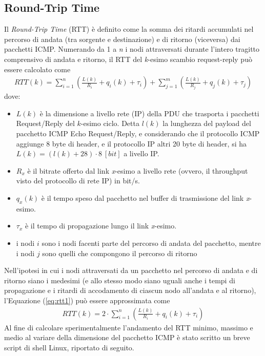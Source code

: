 \documentclass[a4paper,10pt]{article}
\begin{document}
\subsection{Round-Trip Time}
\label{par:x}
Il \textit{Round-Trip Time} (RTT) è definito come la somma dei ritardi accumulati nel percorso di andata (tra sorgente e destinazione) e di ritorno (viceversa) dai pacchetti ICMP. Numerando da 1 a \textit{n} i nodi attraversati durante l'intero tragitto comprensivo di andata e ritorno, il RTT del \textit{k}-esimo scambio request-reply può essere calcolato come
\begin{align}
RTT(k) = \sum_{i=1}^{n}  \left( \frac{L(k)}{R_i} + q_i(k) + \tau_i \right) + \sum_{j=1}^{m}  \left( \frac{L(k)}{R_j} + q_j(k) + \tau_j \right)
\label{eq:rtt1}
\end{align}
\vspace{-0.2cm}
dove:
\begin{itemize}
\item $L(k)$ è la dimensione a livello rete (IP) della PDU che trasporta i pacchetti Request/Reply del $k$-esimo ciclo.  Detta $l(k)$ la lunghezza del payload del pacchetto ICMP Echo Request/Reply, e considerando che il protocollo ICMP aggiunge 8 byte di header, e il protocollo IP altri 20 byte di header, si ha $L(k) = (l(k) + 28) \cdot 8 \ [bit]$ a livello IP.
\item $R_x$ è il bitrate offerto dal link \textit{x}-esimo a livello rete (ovvero, il throughput visto del protocollo di rete IP) in bit/s.
\item $q_x(k)$ è il tempo speso dal pacchetto nel buffer di trasmissione del link \textit{x}-esimo.
\item $\tau_x$ è il tempo di propagazione lungo il link \textit{x}-esimo.
\item i nodi $i$ sono i nodi facenti parte del percorso di andata del pacchetto, mentre i nodi $j$ sono quelli che compongono il percorso di ritorno
\end{itemize}
Nell'ipotesi in cui i nodi attraversati da un pacchetto nel percorso di andata e di ritorno siano i medesimi (e allo stesso modo siano uguali anche i tempi di propagazione e i ritardi di accodamento di ciascun nodo all'andata e al ritorno), l'Equazione (\ref{eq:rtt1}) può essere approssimata come
\begin{align}
RTT(k) = 2 \cdot  \sum_{i=1}^{n}  \left( \frac{L(k)}{R_i} + q_i(k) + \tau_i \right)
\label{eq:rtt}
\end{align}
Al fine di calcolare sperimentalmente l'andamento del RTT minimo, massimo e medio al variare della dimensione del pacchetto ICMP è stato scritto un breve script di shell Linux, riportato di seguito. 
\end{document}
